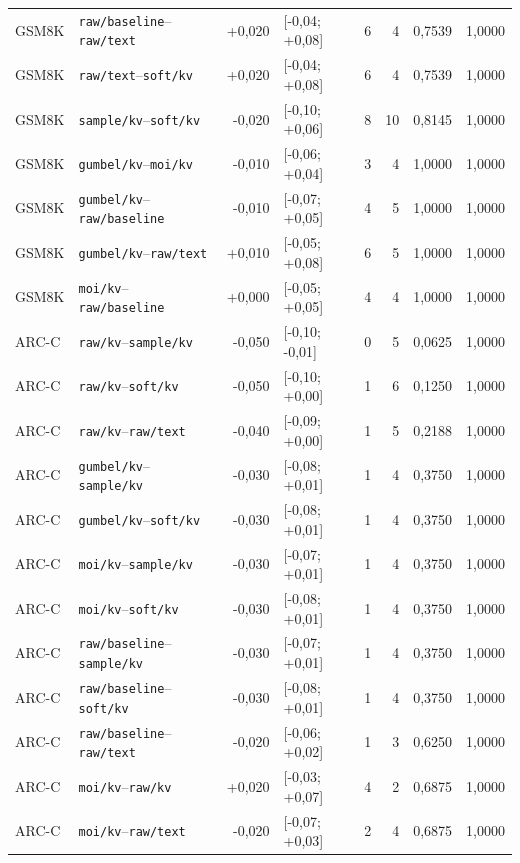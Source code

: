 \begin{longtable}{llrlrrrr}
GSM8K & \texttt{raw/baseline}--\texttt{raw/text} & +0,020 & [-0,04; +0,08] & 6 & 4 & 0,7539 & 1,0000 \\
GSM8K & \texttt{raw/text}--\texttt{soft/kv} & +0,020 & [-0,04; +0,08] & 6 & 4 & 0,7539 & 1,0000 \\
GSM8K & \texttt{sample/kv}--\texttt{soft/kv} & -0,020 & [-0,10; +0,06] & 8 & 10 & 0,8145 & 1,0000 \\
GSM8K & \texttt{gumbel/kv}--\texttt{moi/kv} & -0,010 & [-0,06; +0,04] & 3 & 4 & 1,0000 & 1,0000 \\
GSM8K & \texttt{gumbel/kv}--\texttt{raw/baseline} & -0,010 & [-0,07; +0,05] & 4 & 5 & 1,0000 & 1,0000 \\
GSM8K & \texttt{gumbel/kv}--\texttt{raw/text} & +0,010 & [-0,05; +0,08] & 6 & 5 & 1,0000 & 1,0000 \\
GSM8K & \texttt{moi/kv}--\texttt{raw/baseline} & +0,000 & [-0,05; +0,05] & 4 & 4 & 1,0000 & 1,0000 \\
\hline
ARC-C & \texttt{raw/kv}--\texttt{sample/kv} & -0,050 & [-0,10; -0,01] & 0 & 5 & 0,0625 & 1,0000 \\
ARC-C & \texttt{raw/kv}--\texttt{soft/kv} & -0,050 & [-0,10; +0,00] & 1 & 6 & 0,1250 & 1,0000 \\
ARC-C & \texttt{raw/kv}--\texttt{raw/text} & -0,040 & [-0,09; +0,00] & 1 & 5 & 0,2188 & 1,0000 \\
ARC-C & \texttt{gumbel/kv}--\texttt{sample/kv} & -0,030 & [-0,08; +0,01] & 1 & 4 & 0,3750 & 1,0000 \\
ARC-C & \texttt{gumbel/kv}--\texttt{soft/kv} & -0,030 & [-0,08; +0,01] & 1 & 4 & 0,3750 & 1,0000 \\
ARC-C & \texttt{moi/kv}--\texttt{sample/kv} & -0,030 & [-0,07; +0,01] & 1 & 4 & 0,3750 & 1,0000 \\
ARC-C & \texttt{moi/kv}--\texttt{soft/kv} & -0,030 & [-0,08; +0,01] & 1 & 4 & 0,3750 & 1,0000 \\
ARC-C & \texttt{raw/baseline}--\texttt{sample/kv} & -0,030 & [-0,07; +0,01] & 1 & 4 & 0,3750 & 1,0000 \\
ARC-C & \texttt{raw/baseline}--\texttt{soft/kv} & -0,030 & [-0,08; +0,01] & 1 & 4 & 0,3750 & 1,0000 \\
ARC-C & \texttt{raw/baseline}--\texttt{raw/text} & -0,020 & [-0,06; +0,02] & 1 & 3 & 0,6250 & 1,0000 \\
ARC-C & \texttt{moi/kv}--\texttt{raw/kv} & +0,020 & [-0,03; +0,07] & 4 & 2 & 0,6875 & 1,0000 \\
ARC-C & \texttt{moi/kv}--\texttt{raw/text} & -0,020 & [-0,07; +0,03] & 2 & 4 & 0,6875 & 1,0000 \\

\end{longtable}
